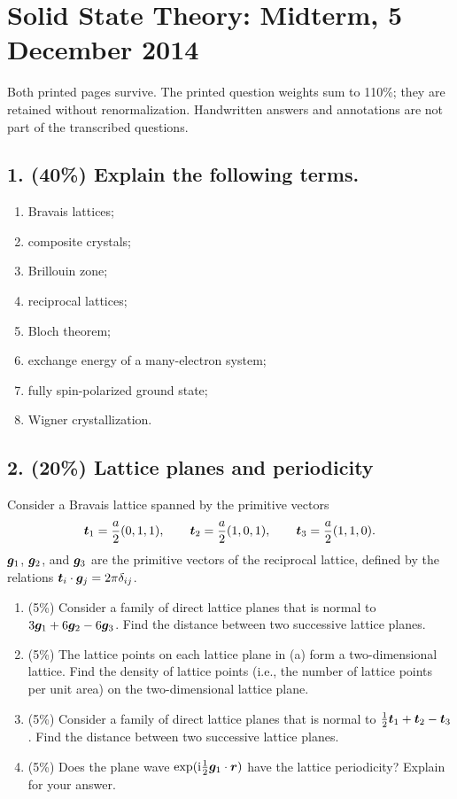 \chapter{Solid State Theory: Midterm, 5 December 2014}
\label{q:theory-2014-12-midterm}
\begin{sourceNote}
Both printed pages survive. The printed question weights sum to 110\%; they are retained without renormalization. Handwritten answers and annotations are not part of the transcribed questions.
\end{sourceNote}

\section*{1. (40\%) Explain the following terms.}
\begin{enumerate}[label=(\alph*)]
\item Bravais lattices;
\item composite crystals;
\item Brillouin zone;
\item reciprocal lattices;
\item Bloch theorem;
\item exchange energy of a many-electron system;
\item fully spin-polarized ground state;
\item Wigner crystallization.
\end{enumerate}

\section*{2. (20\%) Lattice planes and periodicity}
Consider a Bravais lattice spanned by the primitive vectors
\[
\boldsymbol{t}_1=\frac a2(0,1,1),\qquad
\boldsymbol{t}_2=\frac a2(1,0,1),\qquad
\boldsymbol{t}_3=\frac a2(1,1,0).
\]
$\boldsymbol{g}_1$, $\boldsymbol{g}_2$, and $\boldsymbol{g}_3$ are the primitive vectors of the reciprocal lattice, defined by the relations $\boldsymbol{t}_i\cdot\boldsymbol{g}_j=2\pi\delta_{ij}$.
\begin{enumerate}[label=(\alph*)]
\item (5\%) Consider a family of direct lattice planes that is normal to $3\boldsymbol{g}_1+6\boldsymbol{g}_2-6\boldsymbol{g}_3$. Find the distance between two successive lattice planes.
\item (5\%) The lattice points on each lattice plane in (a) form a two-dimensional lattice. Find the density of lattice points (i.e., the number of lattice points per unit area) on the two-dimensional lattice plane.
\item (5\%) Consider a family of direct lattice planes that is normal to $\frac12\boldsymbol{t}_1+\boldsymbol{t}_2-\boldsymbol{t}_3$. Find the distance between two successive lattice planes.
\item (5\%) Does the plane wave $\exp(\mathrm{i}\frac12\boldsymbol{g}_1\cdot\boldsymbol{r})$ have the lattice periodicity? Explain for your answer.
\end{enumerate}

